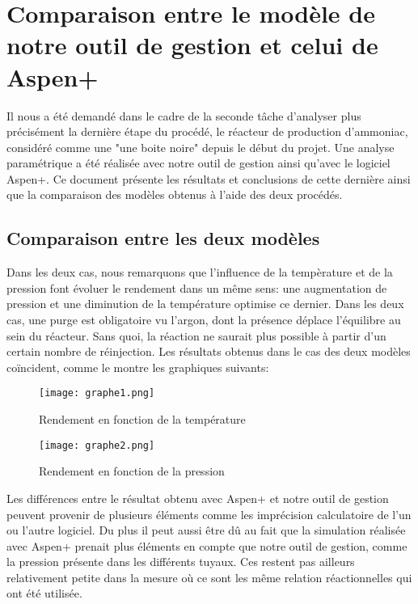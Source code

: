 
\section*{Comparaison entre le modèle de notre outil de gestion et celui de Aspen+}
Il nous a été demandé dans le cadre de la seconde tâche d'analyser plus précisément la dernière étape du procédé, le réacteur de production d'ammoniac, considéré comme une "une boite noire" depuis le début du projet. Une analyse paramétrique a été réalisée avec notre outil de gestion ainsi qu'avec le logiciel Aspen+. Ce document présente les résultats et conclusions de cette dernière ainsi que la comparaison des modèles obtenus à l'aide des deux procédés.


\subsection*{Comparaison entre les deux modèles}
Dans les deux cas, nous remarquons que l'influence de la tempèrature et de la pression font évoluer le rendement dans un même sens: une augmentation de pression et une diminution de la température optimise ce dernier.
Dans les deux cas, une purge est obligatoire vu l'argon, dont la présence déplace l'équilibre au sein du réacteur. Sans quoi, la réaction ne saurait plus possible à partir d'un certain nombre de réinjection. Les résultats obtenus dans le cas des deux modèles coïncident, comme le montre les graphiques suivants:

\begin{figure}[ht!]
 \centering
 \texttt{[image: graphe1.png]}
 \caption{Rendement en fonction de la température}
 \label{scheme}
\end{figure}

\begin{figure}[ht!]
 \centering
 \texttt{[image: graphe2.png]}
 \caption{Rendement en fonction de la pression}
 \label{scheme}
\end{figure}

Les différences entre le résultat obtenu avec Aspen+ et notre outil de gestion peuvent provenir de plusieurs éléments comme les imprécision calculatoire de l'un ou l'autre logiciel. Du plus il peut aussi être dû au fait que la simulation réalisée avec Aspen+ prenait plus éléments en compte que notre outil de gestion, comme la pression présente dans les différents tuyaux. Ces restent pas ailleurs relativement petite dans la mesure où ce sont les même relation réactionnelles qui ont été utilisée.


